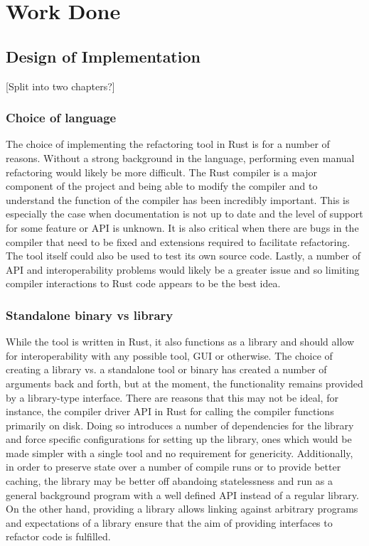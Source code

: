 \chapter{Work Done}\label{C:wd}

\section{Design of Implementation}


[Split into two chapters?]

\subsection{Choice of language}
The choice of implementing the refactoring tool in Rust is for a number of reasons. Without a strong background in the language, performing even manual refactoring would likely be more difficult. The Rust compiler is a major component of the project and being able to modify the compiler and to understand the function of the compiler has been incredibly important. This is especially the case when documentation is not up to date and the level of support for some feature or API is unknown. It is also critical when there are bugs in the compiler that need to be fixed and extensions required to facilitate refactoring. The tool itself could also be used to test its own source code. Lastly, a number of API and interoperability problems would likely be a greater issue and so limiting compiler interactions to Rust code appears to be the best idea. 

\subsection{Standalone binary vs library}
While the tool is written in Rust, it also functions as a library and should allow for interoperability with any possible tool, GUI or otherwise. The choice of creating a library vs. a standalone tool or binary has created a number of arguments back and forth, but at the moment, the functionality remains provided by a library-type interface. There are reasons that this may not be ideal, for instance, the compiler driver API in Rust for calling the compiler functions primarily on disk. Doing so introduces a number of dependencies for the library and force specific configurations for setting up the library, ones which would be made simpler with a single tool and no requirement for genericity. Additionally, in order to preserve state over a number of compile runs or to provide better caching, the library may be better off abandoing statelessness and run as a general background program with a well defined API instead of a regular library. On the other hand, providing a library allows linking against arbitrary programs and expectations of a library ensure that the aim of providing interfaces to refactor code is fulfilled.

